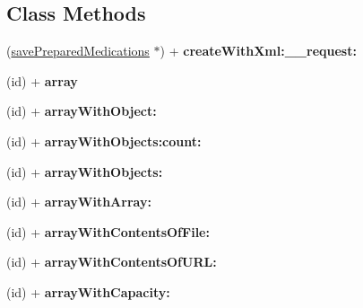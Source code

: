 \subsection*{Class Methods}
\begin{DoxyCompactItemize}
\item 
\hypertarget{interfacesave_prepared_medications_a73c9287bc6512ef65192f3d79772cb8d}{}(\hyperlink{interfacesave_prepared_medications}{save\+Prepared\+Medications} $\ast$) + {\bfseries create\+With\+Xml\+:\+\_\+\+\_\+request\+:}\label{interfacesave_prepared_medications_a73c9287bc6512ef65192f3d79772cb8d}

\item 
\hypertarget{interfacesave_prepared_medications_ac29f4471248a0beaa24c71bf326f5470}{}(id) + {\bfseries array}\label{interfacesave_prepared_medications_ac29f4471248a0beaa24c71bf326f5470}

\item 
\hypertarget{interfacesave_prepared_medications_aca374173918d6d8e467f0e8b17c963c2}{}(id) + {\bfseries array\+With\+Object\+:}\label{interfacesave_prepared_medications_aca374173918d6d8e467f0e8b17c963c2}

\item 
\hypertarget{interfacesave_prepared_medications_a2afca640cab109beac73ef32b509ca4c}{}(id) + {\bfseries array\+With\+Objects\+:count\+:}\label{interfacesave_prepared_medications_a2afca640cab109beac73ef32b509ca4c}

\item 
\hypertarget{interfacesave_prepared_medications_a768c0f26a0849a38b70d65b65871a1d9}{}(id) + {\bfseries array\+With\+Objects\+:}\label{interfacesave_prepared_medications_a768c0f26a0849a38b70d65b65871a1d9}

\item 
\hypertarget{interfacesave_prepared_medications_a99a2630a056af520619815ea0f5bc512}{}(id) + {\bfseries array\+With\+Array\+:}\label{interfacesave_prepared_medications_a99a2630a056af520619815ea0f5bc512}

\item 
\hypertarget{interfacesave_prepared_medications_ad8689d7d691903d5a2a243ca20528653}{}(id) + {\bfseries array\+With\+Contents\+Of\+File\+:}\label{interfacesave_prepared_medications_ad8689d7d691903d5a2a243ca20528653}

\item 
\hypertarget{interfacesave_prepared_medications_a2ab58516bb2c3a79ae5eedf304ae90f9}{}(id) + {\bfseries array\+With\+Contents\+Of\+U\+R\+L\+:}\label{interfacesave_prepared_medications_a2ab58516bb2c3a79ae5eedf304ae90f9}

\item 
\hypertarget{interfacesave_prepared_medications_a466b29b3cddb9959f6bf640740cd8b28}{}(id) + {\bfseries array\+With\+Capacity\+:}\label{interfacesave_prepared_medications_a466b29b3cddb9959f6bf640740cd8b28}

\end{DoxyCompactItemize}
